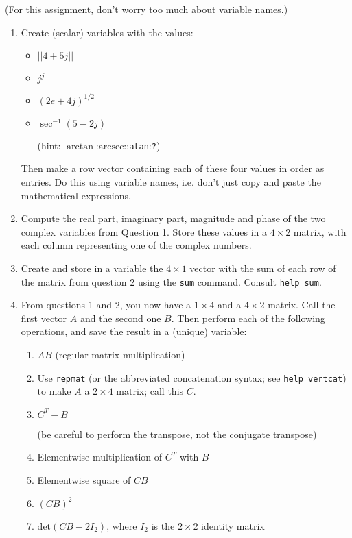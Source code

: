 \documentclass{article}
\begin{document}
	\clearpage
	(For this assignment, don't worry too much about variable names.)
	\begin{enumerate}
		\item Create (scalar) variables with the values:
			\begin{itemize}
				\item $||4+5j||$
				\item $j^j$
				\item $(2e+4j)^{1/2}$
				\item $\sec^{-1}(5-2j)$
				
				(hint: $\arctan$:$\text{arcsec}$::\lstinline|atan|:\lstinline[]|?|)
			\end{itemize}
			Then make a row vector containing each of these four values in order as entries. Do this using variable names, i.e. don't just copy and paste the mathematical expressions.
			
		\item Compute the real part, imaginary part, magnitude and phase of the two complex variables from Question 1. Store these values in a $4\times 2$ matrix, with each column representing one of the complex numbers.
		
		\item Create and store in a variable the $4\times 1$ vector with the sum of each row of the matrix from question 2 using the \lstinline|sum| command. Consult \lstinline|help sum|.
		
		\item From questions 1 and 2, you now have a $1\times 4$ and a $4\times 2$ matrix. Call the first vector $A$ and the second one $B$. Then perform each of the following operations, and save the result in a (unique) variable:
		\begin{enumerate}
			\item $AB$ (regular matrix multiplication)
			\item Use \lstinline|repmat| (or the abbreviated concatenation syntax; see \lstinline|help vertcat|) to make $A$ a $2\times 4$ matrix; call this $C$.
			\item $C^T-B$
			
			(be careful to perform the transpose, not the conjugate transpose)
			\item Elementwise multiplication of $C^T$ with $B$
			\item Elementwise square of $CB$
			\item $(CB)^2$
			\item $\text{det}(CB-2I_2)$, where $I_2$ is the $2\times 2$ identity matrix
		\end{enumerate}
		

\end{enumerate}
\end{document}
